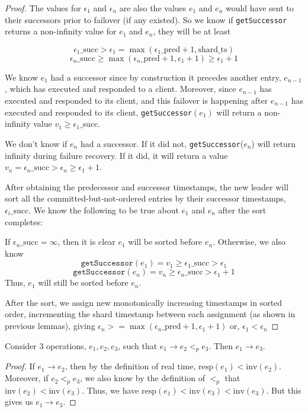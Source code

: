 \begin{proof}
The values for $\epsilon_1$ and $\epsilon_n$ are also the values $e_1$ and $e_n$ would have sent to their successors prior to failover (if any existed). So we know if \texttt{getSuccessor} returns a non-infinity value for $e_1$ and $e_n$, they will be at least


$$\epsilon_1\_\text{succ} > \epsilon_1 = \max(\epsilon_1\_\text{pred} + 1, \text{shard\_ts})$$
$$\epsilon_n\_\text{succ} \geq \max(\epsilon_n\_\text{pred} + 1, \epsilon_1 + 1) \geq \epsilon_1 + 1$$

We know $e_1$ had a successor since by construction it precedes another entry, $e_{n-1}$, which has executed and responded to a client. Moreover, since $e_{n-1}$ has executed and responded to its client, and this failover is happening after $e_{n-1}$ has executed and responded to its client, \texttt{getSuccessor}$(e_1)$ will return a non-infinity value $v_1 \geq \epsilon_1\_\text{succ}$.

We don't know if $e_n$ had a successor. If it did not, \texttt{getSuccessor}($e_n$) will return infinity during failure recovery. If it did, it will return a value $v_n = \epsilon_n\_\text{succ} > \epsilon_n \geq \epsilon_1 + 1$.

After obtaining the predecessor and successor timestamps, the new leader will sort all the committed-but-not-ordered entries by their successor timestamps, $\epsilon_i\_\text{succ}$. We know the following to be true about $e_1$ and $e_n$ after the sort completes:

If $\epsilon_n\_\text{succ} = \infty$, then it is clear $e_1$ will be sorted before $e_n$. Otherwise, we also know 
$$\texttt{getSuccessor}(e_1) = v_1 \geq \epsilon_1\_\text{succ} > \epsilon_1$$
$$\texttt{getSuccessor}(e_n) = v_n \geq \epsilon_n\_\text{succ} > \epsilon_1 + 1$$
Thus, $e_1$ will still be sorted before $e_n$.

After the sort, we assign new monotonically increasing timestamps in sorted order, incrementing the shard timestamp between each assignment (as shown in previous lemmas), giving
$\epsilon_n >= \max(\epsilon_n\_\text{pred} + 1, \epsilon_1 + 1)$
or,
$\epsilon_1 < \epsilon_n$
\end{proof}

\begin{lem}
\label{lemma5}
Consider 3 operations, $e_1, e_2, e_3$, such that $e_1 \rightarrow e_2 <_p e_3$. Then $e_1 \rightarrow e_3$.
\end{lem}
\begin{proof}
    If $e_1 \rightarrow e_2$, then by the definition of real time, $\text{resp}(e_1) < \text{inv}(e_2)$. Moreover, if $e_2 <_p e_3$, we also know by the definition of $<_p$ that $\text{inv}(e_2) < \text{inv}(e_3)$. Thus, we have $\text{resp}(e_1) < \text{inv}(e_3) < \text{inv}(e_3)$. But this gives us $e_1 \rightarrow e_3$.
\end{proof}

